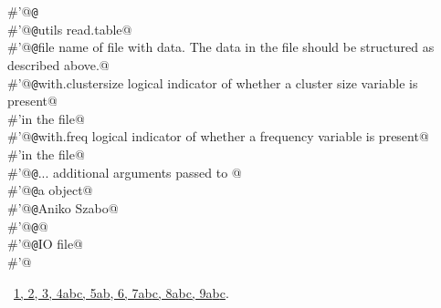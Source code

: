 \documentclass[reqno]{amsart}
\renewcommand{\NWlink}[2]{\hyperlink{#1}{#2}}
\begin{document}
\begin{flushleft}
\begin{minipage}{\linewidth}
\begin{list}{}{}
\mbox{}\verb@#'@{\tt @}\verb@export@\\
\mbox{}\verb@#'@{\tt @}\verb@importFrom utils read.table@\\
\mbox{}\verb@#'@{\tt @}\verb@param file name of file with data. The data in the file should be structured as described above.@\\
\mbox{}\verb@#'@{\tt @}\verb@param with.clustersize logical indicator of whether a cluster size variable is present@\\
\mbox{}\verb@#'in the file@\\
\mbox{}\verb@#'@{\tt @}\verb@param with.freq logical indicator of whether a frequency variable is present@\\
\mbox{}\verb@#'in the file@\\
\mbox{}\verb@#'@{\tt @}\verb@param ... additional arguments passed to @\\
\mbox{}\verb@#'@{\tt @}\verb@return a  object@\\
\mbox{}\verb@#'@{\tt @}\verb@author Aniko Szabo@\\
\mbox{}\verb@#'@{\tt @}\verb@seealso {}@\\
\mbox{}\verb@#'@{\tt @}\verb@keywords IO file@\\
\mbox{}\verb@#'@\\
\mbox{}\verb@@{\NWsep}
\end{list}
\vspace{-1.5ex}
\footnotesize
\begin{list}{}{\setlength{\itemsep}{-\parsep}\setlength{\itemindent}{-\leftmargin}}
\item \NWtxtFileDefBy\ \NWlink{nuweb1}{1}\NWlink{nuweb2}{, 2}\NWlink{nuweb3}{, 3}\NWlink{nuweb4a}{, 4a}\NWlink{nuweb4b}{b}\NWlink{nuweb4c}{c}\NWlink{nuweb5a}{, 5a}\NWlink{nuweb5b}{b}\NWlink{nuweb6}{, 6}\NWlink{nuweb7a}{, 7a}\NWlink{nuweb7b}{b}\NWlink{nuweb7c}{c}\NWlink{nuweb8a}{, 8a}\NWlink{nuweb8b}{b}\NWlink{nuweb8c}{c}\NWlink{nuweb9a}{, 9a}\NWlink{nuweb9b}{b}\NWlink{nuweb9c}{c}.

\item{}
\end{list}
\end{minipage}\vspace{4ex}
\end{flushleft}
\end{document}
